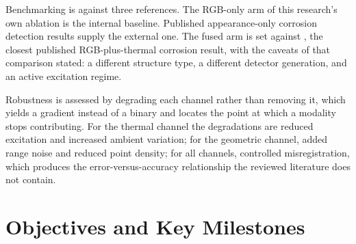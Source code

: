 Benchmarking is against three references. The RGB-only arm of this research's
own ablation is the internal baseline. Published appearance-only corrosion
detection results supply the external one. The fused arm is set against
\citet{Lim2021}, the closest published RGB-plus-thermal corrosion result, with
the caveats of that comparison stated: a different structure type, a different
detector generation, and an active excitation regime.

Robustness is assessed by degrading each channel rather than removing it, which
yields a gradient instead of a binary and locates the point at which a modality
stops contributing. For the thermal channel the degradations are reduced
excitation and increased ambient variation; for the geometric channel, added
range noise and reduced point density; for all channels, controlled
misregistration, which produces the error-versus-accuracy relationship the
reviewed literature does not contain.
\section{Objectives and Key Milestones}
\label{sec:milestones}

